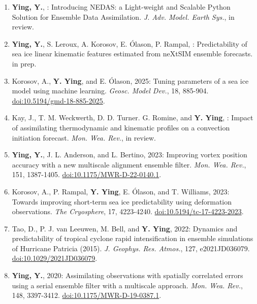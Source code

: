 \begin{enumerate}
\item \textbf{Ying, Y.}, : Introducing NEDAS: a Light-weight and Scalable Python Solution for Ensemble Data Assimilation. 
\textit{J. Adv. Model. Earth Sys.}, in review.

\item \textbf{Ying, Y.}, S. Leroux, A. Korosov, E. Ólason, P. Rampal, : Predictability of sea ice linear kinematic features estimated from neXtSIM ensemble forecasts. 
in prep.

\item Korosov, A., \textbf{Y. Ying}, and E. Ólason, 2025: Tuning parameters of a sea ice model using machine learning. 
\textit{Geosc. Model Dev.}, 18, 885-904. 
\href{https://doi.org/10.5194/gmd-18-885-2025}{doi:10.5194/gmd-18-885-2025}.

\item Kay, J., T. M. Weckwerth, D. D. Turner. G. Romine, and \textbf{Y. Ying}, : Impact of assimilating thermodynamic and kinematic profiles on a convection initiation forecast. 
\textit{Mon. Wea. Rev.}, in review.

\item \textbf{Ying, Y.}, J. L. Anderson, and L. Bertino, 2023: Improving vortex position accuracy with a new multiscale alignment ensemble filter. 
\textit{Mon. Wea. Rev.}, 151, 1387-1405. 
\href{https://doi.org/10.1175/MWR-D-22-0140.1}{doi:10.1175/MWR-D-22-0140.1}.

\item Korosov, A., P. Rampal, \textbf{Y. Ying}, E. Ólason, and T. Williams, 2023: Towards improving short-term sea ice predictability using deformation observations. 
\textit{The Cryosphere}, 17, 4223-4240. 
\href{https://doi.org/10.5194/tc-17-4223-2023}{doi:10.5194/tc-17-4223-2023}.

\item Tao, D., P. J. van Leeuwen, M. Bell, and \textbf{Y. Ying}, 2022: Dynamics and predictability of tropical cyclone rapid intensification in ensemble simulations of Hurricane Patricia (2015). 
\textit{J. Geophys. Res. Atmos.}, 127, e2021JD036079. 
\href{https://doi.org/10.1029/2021JD036079}{doi:10.1029/2021JD036079}.

\item \textbf{Ying, Y.}, 2020: Assimilating observations with spatially correlated errors using a serial ensemble filter with a multiscale approach. 
\textit{Mon. Wea. Rev.}, 148, 3397-3412. 
\href{https://doi.org/10.1175/MWR-D-19-0387.1}{doi:10.1175/MWR-D-19-0387.1}.


\end{enumerate}
